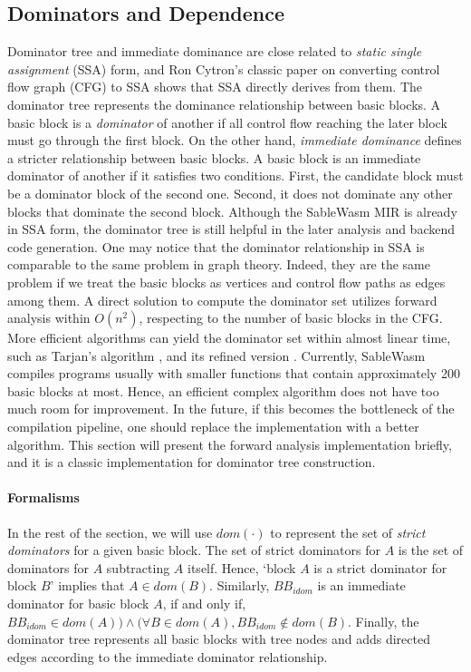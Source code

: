 \subsection{Dominators and Dependence}

Dominator tree and immediate dominance are close related to \emph{static single
    assignment} (SSA) form, and Ron Cytron's classic paper on converting
control flow graph (CFG) to SSA \cite{ibm-ssa} shows that SSA directly derives
from them. The dominator tree represents the dominance relationship between
basic blocks. A basic block is a \emph{dominator} of another if all control flow
reaching the later block must go through the first block. On the other hand,
\emph{immediate dominance} defines a stricter relationship between basic blocks.
A basic block is an immediate dominator of another if it satisfies two
conditions. First, the candidate block must be a dominator block of the second
one. Second, it does not dominate any other blocks that dominate the second
block. Although the SableWasm MIR is already in SSA form, the dominator tree is
still helpful in the later analysis and backend code generation. One may notice
that the dominator relationship in SSA is comparable to the same problem in
graph theory. Indeed, they are the same problem if we treat the basic blocks as
vertices and control flow paths as edges among them.  A direct solution to
compute the dominator set utilizes forward analysis within $O(n^2)$, respecting
to the number of basic blocks in the CFG. More efficient algorithms can yield
the dominator set within almost linear time, such as Tarjan's algorithm
\cite{tarjan-fast-dominator}, and its refined version
\cite{tarjan-fast-dominator-improved}. Currently, SableWasm compiles programs
usually with smaller functions that contain approximately 200 basic blocks at
most. Hence, an efficient complex algorithm does not have too much room for
improvement. In the future, if this becomes the bottleneck of the compilation
pipeline, one should replace the implementation with a better algorithm. This
section will present the forward analysis implementation briefly, and it is a
classic implementation for dominator tree construction.

\paragraph{Formalisms}
In the rest of the section, we will use $dom(\cdot)$ to represent the set of
\emph{strict dominators} for a given basic block. The set of strict dominators
for $A$ is the set of dominators for $A$ subtracting $A$ itself. Hence, `block
$A$ is a strict dominator for block $B$' implies that $A \in dom(B)$. Similarly,
$BB_{idom}$ is an immediate dominator for basic block $A$, if and only if,
$BB_{idom} \in dom(A)) \land (\forall B \in dom(A), BB_{idom} \notin dom(B)$.
Finally, the dominator tree represents all basic blocks with tree nodes and adds
directed edges according to the immediate dominator relationship.

